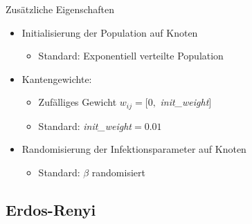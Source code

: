 \begin{frame}{Zusätzliche Eigenschaften}
    \begin{itemize}
        \item Initialisierung der Population auf Knoten 
            \begin{itemize}
                \item Standard: Exponentiell verteilte Population
            \end{itemize}
        \vfill\item<2-> Kantengewichte:
            \begin{itemize}
                \item Zufälliges Gewicht $w_{ij} = [0,$ \emph{init\_weight}$]$
                \item Standard: \emph{init\_weight}$=0.01$
            \end{itemize}
        \vfill\item<2-> Randomisierung der Infektionsparameter auf Knoten
            \begin{itemize}
                \item Standard: $\beta$ randomisiert
            \end{itemize}
    \end{itemize}
\end{frame}

\subsection{Erdos-Renyi}

